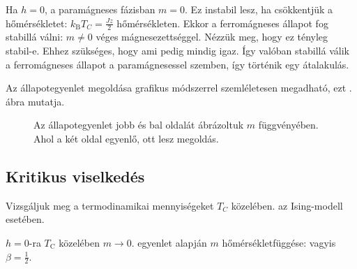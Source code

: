    Ha $h=0$, a paramágneses fázisban $m=0$. Ez instabil lesz, ha csökkentjük a hőmérsékletet: $k_\text{B}T_C=\frac{Jz}{2}$ hőmérsékleten. Ekkor a ferromágneses állapot fog stabillá válni: $m\ne 0$ véges mágnesezettséggel. Nézzük meg, hogy ez tényleg stabil-e. Ehhez szükséges, hogy 
   ami pedig mindig igaz. Így valóban stabillá válik a ferromágneses állapot a paramágnesessel szemben, így történik egy átalakulás. 
   
   Az állapotegyenlet megoldása grafikus módszerrel szemléletesen megadható, ezt . ábra mutatja.
   \begin{figure}[ht!]
    \centering
     \hspace{6pt}
    \caption{Az állapotegyenlet jobb és bal oldalát ábrázoltuk $m$ függvényében. Ahol a két oldal egyenlő, ott lesz megoldás.}\label{fig:B08-grafikusmego}
   \end{figure}
   
   
  \subsection{Kritikus viselkedés}
   
   Vizsgáljuk meg a termodinamikai mennyiségeket $T_C$ közelében. az Ising-modell esetében. 
   
   $h=0$-ra $T_\text{C}$ közelében $m\to 0$.  egyenlet alapján $m$ hőmérsékletfüggése:
   vagyis $\beta=\frac{1}{2}$.
   
